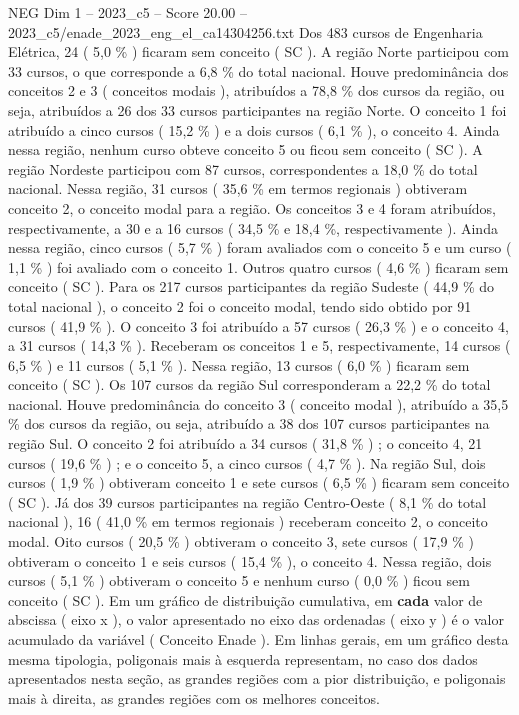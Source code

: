 \begin{textsample}{NEG Dim 1 – 2023\_c5 – Score 20.00 – 2023\_c5/enade\_2023\_eng\_el\_ca14304256.txt}
Dos 483 cursos de Engenharia Elétrica, 24 ( 5,0 \% ) ficaram sem conceito ( SC ).
A região Norte participou com 33 cursos, o que corresponde a 6,8 \% do total nacional.
Houve predominância dos conceitos 2 e 3 ( conceitos modais ), atribuídos a 78,8 \% dos cursos da região, ou seja, atribuídos a 26 dos 33 cursos participantes na região Norte.
O conceito 1 foi atribuído a cinco cursos ( 15,2 \% ) e a dois cursos ( 6,1 \% ), o conceito 4.
Ainda nessa região, nenhum curso obteve conceito 5 ou ficou sem conceito ( SC ).
A região Nordeste participou com 87 cursos, correspondentes a 18,0 \% do total nacional.
Nessa região, 31 cursos ( 35,6 \% em termos regionais ) obtiveram conceito 2, o conceito modal para a região.
Os conceitos 3 e 4 foram atribuídos, respectivamente, a 30 e a 16 cursos ( 34,5 \% e 18,4 \%, respectivamente ).
Ainda nessa região, cinco cursos ( 5,7 \% ) foram avaliados com o conceito 5 e um curso ( 1,1 \% ) foi avaliado com o conceito 1.
Outros quatro cursos ( 4,6 \% ) ficaram sem conceito ( SC ).
Para os 217 cursos participantes da região Sudeste ( 44,9 \% do total nacional ), o conceito 2 foi o conceito modal, tendo sido obtido por 91 cursos ( 41,9 \% ).
O conceito 3 foi atribuído a 57 cursos ( 26,3 \% ) e o conceito 4, a 31 cursos ( 14,3 \% ).
Receberam os conceitos 1 e 5, respectivamente, 14 cursos ( 6,5 \% ) e 11 cursos ( 5,1 \% ).
Nessa região, 13 cursos ( 6,0 \% ) ficaram sem conceito ( SC ).
Os 107 cursos da região Sul corresponderam a 22,2 \% do total nacional.
Houve predominância do conceito 3 ( conceito modal ), atribuído a 35,5 \% dos cursos da região, ou seja, atribuído a 38 dos 107 cursos participantes na região Sul.
O conceito 2 foi atribuído a 34 cursos ( 31,8 \% ) ; o conceito 4, 21 cursos ( 19,6 \% ) ; e o conceito 5, a cinco cursos ( 4,7 \% ).
Na região Sul, dois cursos ( 1,9 \% ) obtiveram conceito 1 e sete cursos ( 6,5 \% ) ficaram sem conceito ( SC ).
Já dos 39 cursos participantes na região Centro-Oeste ( 8,1 \% do total nacional ), 16 ( 41,0 \% em termos regionais ) receberam conceito 2, o conceito modal.
Oito cursos ( 20,5 \% ) obtiveram o conceito 3, sete cursos ( 17,9 \% ) obtiveram o conceito 1 e seis cursos ( 15,4 \% ), o conceito 4.
Nessa região, dois cursos ( 5,1 \% ) obtiveram o conceito 5 e nenhum curso ( 0,0 \% ) ficou sem conceito ( SC ).
Em um gráfico de distribuição cumulativa, em \textbf{cada} valor de abscissa ( eixo x ), o valor apresentado no eixo das ordenadas ( eixo y ) é o valor acumulado da variável ( Conceito Enade ).
Em linhas gerais, em um gráfico desta mesma tipologia, poligonais mais à esquerda representam, no caso dos dados apresentados nesta seção, as grandes regiões com a pior distribuição, e poligonais mais à direita, as grandes regiões com os melhores conceitos.

\end{textsample}
